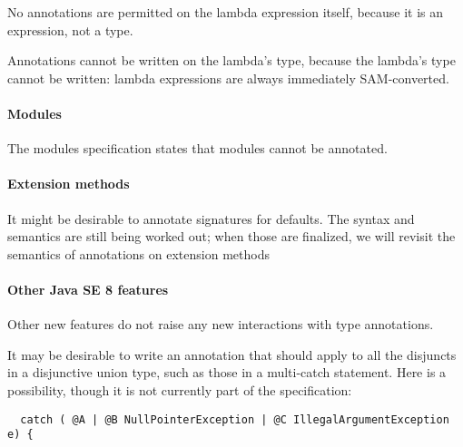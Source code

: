 \documentclass[10pt]{article}
\begin{document}
No annotations are permitted on the lambda expression itself, because it is
an expression, not a type.

Annotations cannot be written on the lambda's type, because the lambda's
type cannot be written:  lambda expressions are always immediately
SAM-converted.





\paragraph{Modules}
The modules specification states that modules cannot be annotated.


\paragraph{Extension methods}
It might be desirable to annotate signatures for defaults.
The syntax and semantics are still being worked out; when those are
finalized, we will revisit the semantics of annotations on extension
methods


\paragraph{Other Java SE 8 features}
Other new features do not raise any new interactions with type annotations.


It may be desirable to write an annotation that should apply to all
the disjuncts in a disjunctive union type, such as those in a multi-catch
statement.  Here is a possibility, though it is not currently part of the
specification:

\begin{Verbatim}
  catch ( @A | @B NullPointerException | @C IllegalArgumentException e) {
\end{Verbatim}
\end{document}
